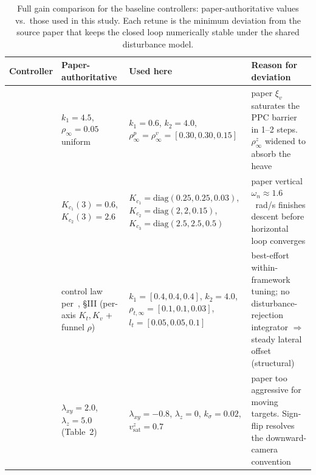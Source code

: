 \documentclass{IEEEtaes}
\begin{document}
\begin{table}[!t]
\centering
\footnotesize
\caption{Full gain comparison for the baseline controllers: paper-authoritative values vs.\ those used in this study. Each retune is the minimum deviation from the source paper that keeps the closed loop numerically stable under the shared disturbance model.}
\label{baseline gains: table}
\begin{tabular}{p{} p{} p{} p{}}
\toprule
\textbf{Controller} & \textbf{Paper-authoritative} & \textbf{Used here} & \textbf{Reason for deviation} \\
\midrule
\cite{lin2022} & $k_1{=}4.5$, $\rho_\infty{=}0.05$ uniform & $k_1{=}0.6$, $k_2{=}4.0$, $\rho_\infty^p{=}\rho_\infty^v{=}[0.30,0.30,0.15]$ & paper $\xi_v$ saturates the PPC barrier in 1--2 steps. $\rho_\infty^z$ widened to absorb the~\cite{lin2022} heave \\
\cite{zhang2026} & $K_{c_1}(3){=}0.6$, $K_{c_2}(3){=}2.6$ & $K_{c_1}{=}\text{diag}(0.25,0.25,0.03)$, $K_{c_2}{=}\text{diag}(2,2,0.15)$, $K_{c_3}{=}\text{diag}(2.5,2.5,0.5)$ & paper vertical $\omega_n{\approx}1.6$~rad/s finishes descent before horizontal loop converges \\
\cite{lin2023} & control law per~\cite{lin2023}, \S III (per-axis $K_t,K_v$ + funnel $\rho$) & $k_1{=}[0.4,0.4,0.4]$, $k_2{=}4.0$, $\rho_{t,\infty}{=}[0.1,0.1,0.03]$, $l_t{=}[0.05,0.05,0.1]$ & best-effort within-framework tuning; no disturbance-rejection integrator $\Rightarrow$ steady lateral offset (structural) \\
\cite{cho2022} & $\lambda_{xy}{=}2.0$, $\lambda_z{=}5.0$ (Table~2) & $\lambda_{xy}{=}{-}0.8$, $\lambda_z{=}0$, $k_\sigma{=}0.02$, $v_\text{sat}^z{=}0.7$ & paper too aggressive for moving targets. Sign-flip resolves the downward-camera convention \\
\bottomrule
\end{tabular}
\end{table}
\end{document}
